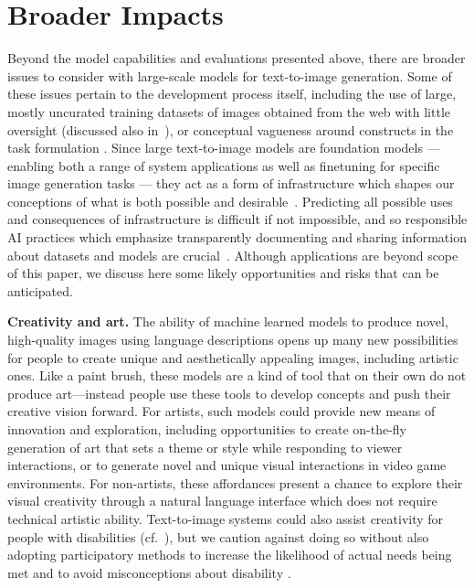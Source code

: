 \section{Broader Impacts}
\label{secs:broader}

Beyond the model capabilities and evaluations presented above, there are broader issues to consider with large-scale models for text-to-image generation. Some of these issues pertain to the development process itself, including the use of large, mostly uncurated training datasets of images obtained from the web with little oversight (discussed also in~\cite{imagen}), or conceptual vagueness around constructs in the task formulation \cite{description2depiction}. Since large text-to-image models are foundation models \cite{bommasani2021opportunities} --- enabling both a range of system applications as well as finetuning for specific image generation tasks --- they act as a form of infrastructure which shapes our conceptions of what is both possible and desirable~\cite{hutchinson2021towards, denton2021genealogy}. Predicting all possible uses and consequences of infrastructure is difficult if not impossible, and so responsible AI practices which emphasize transparently documenting and sharing information about datasets and models are crucial~\cite{mitchell2019model, gebru2021datasheets, pushkarna2022data}. Although applications are beyond scope of this paper, we discuss here some likely opportunities and risks that can be anticipated.

\textbf{Creativity and art.} The ability of machine learned models to produce novel, high-quality images using language descriptions opens up many new possibilities for people to create unique and aesthetically appealing images, including artistic ones. Like a paint brush, these models are a kind of tool that on their own do not produce art---instead people use these tools to develop concepts and push their creative vision forward. For artists, such models could provide new means of innovation and exploration, including opportunities to create on-the-fly generation of art that sets a theme or style while responding to viewer interactions, or to generate novel and unique visual interactions in video game environments. For non-artists, these affordances present a chance to explore their visual creativity through a natural language interface which does not require technical artistic ability. Text-to-image systems could also assist creativity for people with disabilities (cf.~\cite{el2019tell, sharma2018chatpainter}), but we caution against doing so without also adopting participatory methods to increase the likelihood of actual needs being met and to avoid misconceptions about disability \cite{mankoff2010disability}.

